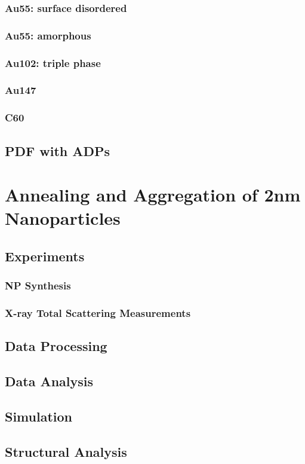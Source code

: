 \documentclass{uscthesis}
\theoremstyle{definition}
\theoremstyle{plain}
\begin{document}
\subsection{Au55: surface disordered}
\subsection{Au55: amorphous}
\subsection{Au102: triple phase}
\subsection{Au147}
\subsection{C60}
\section{PDF with ADPs}

\chapter{Annealing and Aggregation of 2nm \\ Nanoparticles}
\section{Experiments}
\subsection{NP Synthesis}
\subsection{X-ray Total Scattering Measurements}
\section{Data Processing}
\section{Data Analysis}
\section{Simulation}
\section{Structural Analysis}
\end{document}
